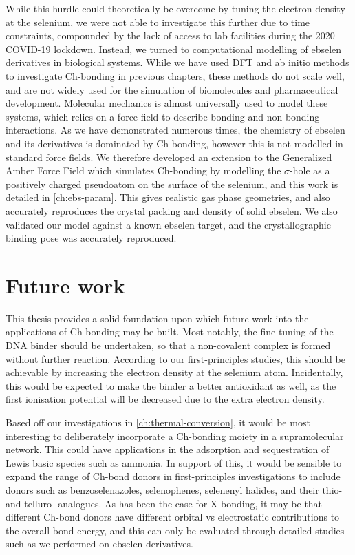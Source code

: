 \begin{refsection}
While this hurdle could theoretically be overcome by tuning the electron density at the selenium, we were not able to investigate this further due to time constraints, compounded by the lack of access to lab facilities during the 2020 COVID-19 lockdown.
Instead, we turned to computational modelling of ebselen derivatives in biological systems.
While we have used DFT and ab initio methods to investigate Ch-bonding in previous chapters, these methods do not scale well, and are not widely used for the simulation of biomolecules and pharmaceutical development.
Molecular mechanics is almost universally used to model these systems, which relies on a force-field to describe bonding and non-bonding interactions.
As we have demonstrated numerous times, the chemistry of ebselen and its derivatives is dominated by Ch-bonding, however this is not modelled in standard force fields.
We therefore developed an extension to the Generalized Amber Force Field which simulates Ch-bonding by modelling the $\sigma$-hole as a positively charged pseudoatom on the surface of the selenium, and this work is detailed in \cref{ch:ebs-param}.
This gives realistic gas phase geometries, and also accurately reproduces the crystal packing and density of solid ebselen.
We also validated our model against a known ebselen target, and the crystallographic binding pose was accurately reproduced.

\section{Future work}
This thesis provides a solid foundation upon which future work into the applications of Ch-bonding may be built.
Most notably, the fine tuning of the DNA binder should be undertaken, so that a non-covalent complex is formed without further reaction.
According to our first-principles studies, this should be achievable by increasing the electron density at the selenium atom.
Incidentally, this would be expected to make the binder a better antioxidant as well, as the first ionisation potential will be decreased due to the extra electron density.

Based off our investigations in \cref{ch:thermal-conversion}, it would be most interesting to deliberately incorporate a Ch-bonding moiety in a supramolecular network.
This could have applications in the adsorption and sequestration of Lewis basic species such as ammonia.
In support of this, it would be sensible to expand the range of Ch-bond donors in first-principles investigations to include donors such as benzoselenazoles, selenophenes, selenenyl halides, and their thio- and telluro- analogues. 
As has been the case for X-bonding, it may be that different Ch-bond donors have different orbital vs electrostatic contributions to the overall bond energy, and this can only be evaluated through detailed studies such as we performed on ebselen derivatives.


\end{refsection}
